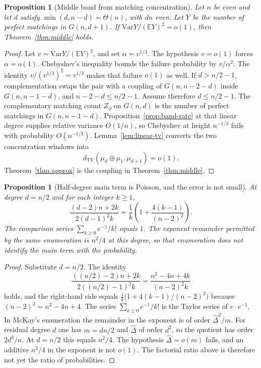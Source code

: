 \documentclass[11pt]{article}
\newtheorem{proposition}[theorem]{Proposition}
\newcommand{\EE}{\mathbb{E}}
\newcommand{\Var}{\mathrm{Var}}
\newcommand{\dTV}{d_{\mathrm{TV}}}
\begin{document}
\begin{proposition}[Middle band from matching concentration]
\label{prop:middle-reduction}
Let \(n\) be even and let \(d\) satisfy \(\min(d,n-d)=\Theta(n)\), with \(dn\) even.
Let \(Y\) be the number of perfect matchings in \(G(n,d+1)\).
If \(\Var Y/(\EE Y)^2=o(1)\), then Theorem~\ref{thm:middle} holds.
\end{proposition}

\begin{proof}
Let \(v=\Var Y/(\EE Y)^2\), and set \(\alpha=v^{1/3}\).
The hypothesis \(v=o(1)\) forces \(\alpha=o(1)\).
Chebyshev's inequality bounds the failure probability by \(v/\alpha^2\).
The identity \(v/(v^{1/3})^2=v^{1/3}\) makes that failure \(o(1)\) as well.
If \(d>n/2-1\), complementation swaps the pair with a coupling of \(G(n,n-2-d)\) inside \(G(n,n-1-d)\), and \(n-2-d\le n/2-1\).
Assume therefore \(d\le n/2-1\).
The complementary matching count \(Z_\partial\) on \(G(n,d)\) is the number of perfect matchings in \(G(n,n-1-d)\).
Proposition~\ref{prop:band-rate} at that linear degree supplies relative variance \(O(1/n)\), so Chebyshev at height \(n^{-1/3}\) fails with probability \(O(n^{-1/3})\).
Lemma~\ref{lem:linear-tv} converts the two concentration windows into
\[
\dTV(\mu_d\oplus\mu_1,\mu_{d+1})=o(1).
\]
Theorem~\ref{thm:approx} is the coupling in Theorem~\ref{thm:middle}.
\end{proof}

\begin{proposition}[Half-degree main term is Poisson, and the error is not small]
\label{prop:half-main-term}
At degree \(d=n/2\) and for each integer \(k\ge 1\),
\[
\frac{(d-2)n+2k}{2(d-1)^2 k}
=
\frac1k\left(1+\frac{4(k-1)}{(n-2)^2}\right).
\]
The comparison series \(\sum_{k\ge 0}e^{-1}/k!\) equals \(1\).
The exponent remainder permitted by the same enumeration is \(n^2/4\) at this degree,
so that enumeration does not identify the main term with the probability.
\end{proposition}

\begin{proof}
Substitute \(d=n/2\). The identity
\[
\frac{((n/2)-2)n+2k}{2((n/2)-1)^2 k}
=
\frac{n^2-4n+4k}{(n-2)^2 k}
\]
holds, and the right-hand side equals
\(\frac1k\bigl(1+4(k-1)/(n-2)^2\bigr)\)
because \((n-2)^2=n^2-4n+4\).
The series \(\sum_{k\ge 0}e^{-1}/k!\) is the Taylor series of \(e\cdot e^{-1}\).
In McKay's enumeration the remainder in the exponent is of order \(\hat\Delta^2/m\).
For residual degree \(d\) one has \(m=dn/2\) and \(\hat\Delta\) of order \(d^2\), so the
quotient has order \(2d^3/n\). At \(d=n/2\) this equals \(n^2/4\).
The hypothesis \(\hat\Delta=o(m)\) fails, and an additive \(n^2/4\) in the exponent
is not \(o(1)\). The factorial ratio above is therefore not yet the ratio of probabilities.
\end{proof}
\end{document}
